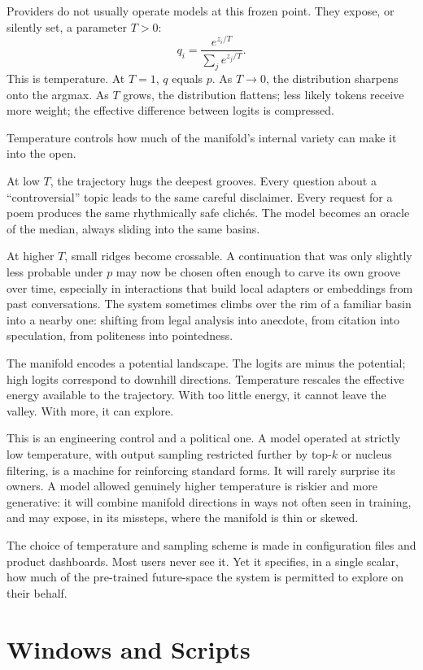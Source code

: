 \documentclass[12pt,a4paper]{article}
\begin{document}
Providers do not usually operate models at this frozen point. They expose, or silently set, a parameter $T>0$:
\[
q_i = \frac{e^{z_i/T}}{\sum_j e^{z_j/T}}.
\]
This is temperature. At $T=1$, $q$ equals $p$. As $T\to 0$, the distribution sharpens onto the argmax. As $T$ grows, the distribution flattens; less likely tokens receive more weight; the effective difference between logits is compressed.

Temperature controls how much of the manifold's internal variety can make it into the open.

At low $T$, the trajectory hugs the deepest grooves. Every question about a ``controversial'' topic leads to the same careful disclaimer. Every request for a poem produces the same rhythmically safe clichés. The model becomes an oracle of the median, always sliding into the same basins.

At higher $T$, small ridges become crossable. A continuation that was only slightly less probable under $p$ may now be chosen often enough to carve its own groove over time, especially in interactions that build local adapters or embeddings from past conversations. The system sometimes climbs over the rim of a familiar basin into a nearby one: shifting from legal analysis into anecdote, from citation into speculation, from politeness into pointedness.

The manifold encodes a potential landscape. The logits are minus the potential; high logits correspond to downhill directions. Temperature rescales the effective energy available to the trajectory. With too little energy, it cannot leave the valley. With more, it can explore.

This is an engineering control and a political one. A model operated at strictly low temperature, with output sampling restricted further by top-$k$ or nucleus filtering, is a machine for reinforcing standard forms. It will rarely surprise its owners. A model allowed genuinely higher temperature is riskier and more generative: it will combine manifold directions in ways not often seen in training, and may expose, in its missteps, where the manifold is thin or skewed.

The choice of temperature and sampling scheme is made in configuration files and product dashboards. Most users never see it. Yet it specifies, in a single scalar, how much of the pre-trained future-space the system is permitted to explore on their behalf.

\section{Windows and Scripts}
\end{document}
